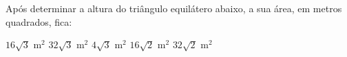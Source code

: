 Após determinar a altura do triângulo equilátero abaixo, a sua área, em metros quadrados, fica:

\parbox{0.4\linewidth}{

$16\sqrt{3}$ m$^2$
$32\sqrt{3}$ m$^2$
$4\sqrt{3}$ m$^2$
$16\sqrt{2}$ m$^2$
$32\sqrt{2}$ m$^2$

}\parbox{0.59\linewidth}{
\begin{center}
\vspace{-6mm}
\vspace{-9mm}
\end{center}
}


